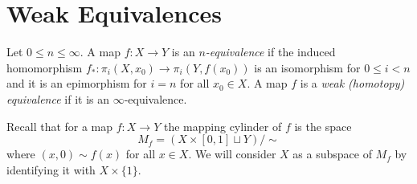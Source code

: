 

\chapter[Weak Equivalences]{Weak Equivalences}
\label{WEAK EQUIVALENCES CHAPTER}
\thispagestyle{firststyle}





\begin{definition}
Let $0 \leq n \leq \infty$. 
A map $f\colon X \to Y$ is an \emph{$n$-equivalence} if the induced homomorphism
$f_{\ast}\colon \pi_{i}(X, x_{0}) \to \pi_{i}(Y, f(x_{0}))$ is an 
isomorphism for  $0\leq i<n$ and it is an epimorphism for $i=n$ for all 
$x_{0}\in X$. A map $f$ is a \emph{weak (homotopy) equivalence} if it is an $\infty$-equivalence.
\end{definition}

Recall that for a map $f\colon X\to Y$ the mapping cylinder of $f$ is the space
\[
M_{f} = (X \times [0, 1] \sqcup Y) / {\sim}
\]
where $(x, 0) \sim f(x)$ for all $x\in X$. We will consider $X$ as a subspace 
of $M_{f}$ by identifying it with $X\times \{1\}$. 

